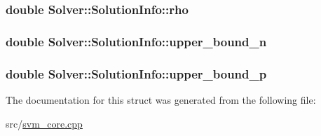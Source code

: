 \subsubsection[{rho}]{\setlength{\rightskip}{0pt plus 5cm}double Solver\+::\+Solution\+Info\+::rho}\hypertarget{structSolver_1_1SolutionInfo_a8091f45a336af39e232f3845e25f2266}{}\label{structSolver_1_1SolutionInfo_a8091f45a336af39e232f3845e25f2266}
\subsubsection[{upper\+\_\+bound\+\_\+n}]{\setlength{\rightskip}{0pt plus 5cm}double Solver\+::\+Solution\+Info\+::upper\+\_\+bound\+\_\+n}\hypertarget{structSolver_1_1SolutionInfo_a07ab9dc3265855f483922988bdaaf986}{}\label{structSolver_1_1SolutionInfo_a07ab9dc3265855f483922988bdaaf986}
\subsubsection[{upper\+\_\+bound\+\_\+p}]{\setlength{\rightskip}{0pt plus 5cm}double Solver\+::\+Solution\+Info\+::upper\+\_\+bound\+\_\+p}\hypertarget{structSolver_1_1SolutionInfo_a94c4cb7f402752326cc975ec57a8688f}{}\label{structSolver_1_1SolutionInfo_a94c4cb7f402752326cc975ec57a8688f}


The documentation for this struct was generated from the following file\+:\begin{DoxyCompactItemize}
\item 
src/\hyperlink{svm__core_8cpp}{svm\+\_\+core.\+cpp}\end{DoxyCompactItemize}
